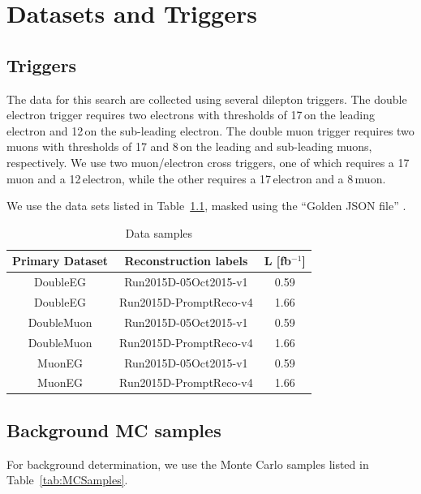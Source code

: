 \chapter{Datasets and Triggers}
\label{chap:Samples}

\section{Triggers}
The data for this search are collected using several dilepton triggers. The double electron trigger requires two electrons with \pt thresholds of 17\,\GeV on the leading electron and 12\,\GeV on the sub-leading electron. The double muon trigger requires two muons with \pt thresholds of 17 and 8\,\GeV on the leading and sub-leading muons, respectively. We use two muon/electron cross triggers, one of which requires a 17\,\GeV muon and a 12\,\GeV electron, while the other requires a 17\,\GeV electron and a 8\,\GeV muon.

We use the data sets listed in Table~\ref{tab:DataSamples}, masked using the ``Golden JSON file'' .

\begin{table}
\centering
\caption{Data samples} \label{tab:DataSamples}
\begin{tabular}{c c c}
\hline\hline
Primary Dataset & Reconstruction labels & L [fb$^{-1}$]\\
\hline
DoubleEG & Run2015D-05Oct2015-v1 & 0.59\\
DoubleEG & Run2015D-PromptReco-v4 & 1.66\\
\hline
DoubleMuon & Run2015D-05Oct2015-v1 & 0.59\\
DoubleMuon & Run2015D-PromptReco-v4 & 1.66\\
\hline
MuonEG & Run2015D-05Oct2015-v1 & 0.59\\
MuonEG & Run2015D-PromptReco-v4 & 1.66\\
\end{tabular}
\end{table}


\section{Background MC samples}
For background determination, we use the Monte Carlo samples listed in Table~\ref{tab:MCSamples}.

